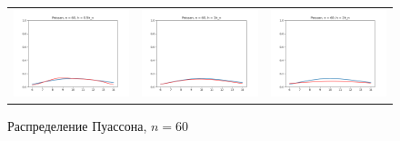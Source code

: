 	\begin{figure}[H]
		\centering
		\begin{tabular}{ccc}
			\includegraphics[width=55mm, height =0.25\textheight]{pics/ker_p_60_1.png}
			&
			\includegraphics[width=55mm, height =0.25\textheight]{pics/ker_p_60_2.png}
			&
			\includegraphics[width=55mm, height =0.25\textheight]{pics/ker_p_60_3.png}
		\end{tabular}
		\caption{Распределение Пуассона, $n = 60$}
		\label{fig:poisson}
	\end{figure}

